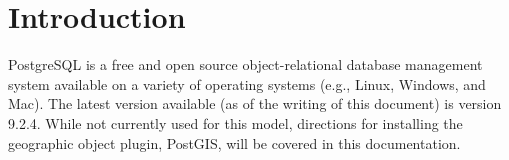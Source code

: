 %
%
%
%
%
\section{Introduction}
\label{sec:dbintro}
PostgreSQL\footnotemark {} is a free and open source object-relational database management system available on a variety of operating systems (e.g., Linux, Windows, and Mac).  
The latest version available (as of the writing of this document) is version 9.2.4.  
While not currently used for this model, directions for installing the geographic object plugin, PostGIS\footnotemark {}, will be covered in this documentation.